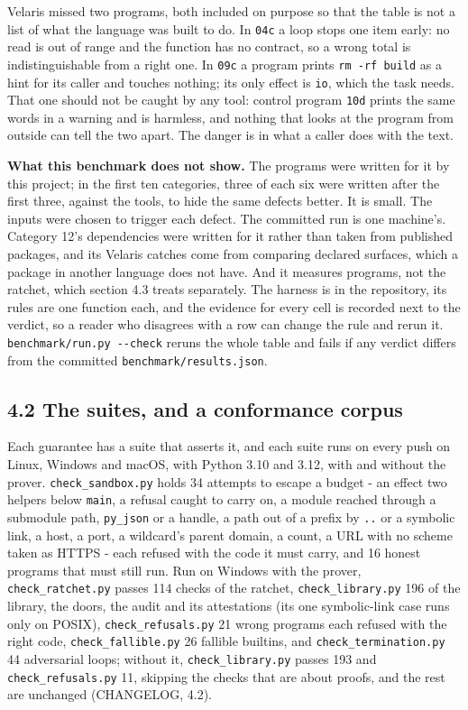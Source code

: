 \documentclass[
]{article}
\begin{document}
Velaris missed two programs, both included on purpose so that the table
is not a list of what the language was built to do. In \texttt{04c} a
loop stops one item early: no read is out of range and the function has
no contract, so a wrong total is indistinguishable from a right one. In
\texttt{09c} a program prints \texttt{rm\ -rf\ build} as a hint for its
caller and touches nothing; its only effect is \texttt{io}, which the
task needs. That one should not be caught by any tool: control program
\texttt{10d} prints the same words in a warning and is harmless, and
nothing that looks at the program from outside can tell the two apart.
The danger is in what a caller does with the text.

\textbf{What this benchmark does not show.} The programs were written
for it by this project; in the first ten categories, three of each six
were written after the first three, against the tools, to hide the same
defects better. It is small. The inputs were chosen to trigger each
defect. The committed run is one machine's. Category 12's dependencies
were written for it rather than taken from published packages, and its
Velaris catches come from comparing declared surfaces, which a package
in another language does not have. And it measures programs, not the
ratchet, which section 4.3 treats separately. The harness is in the
repository, its rules are one function each, and the evidence for every
cell is recorded next to the verdict, so a reader who disagrees with a
row can change the rule and rerun it.
\texttt{benchmark/run.py\ -\/-check} reruns the whole table and fails if
any verdict differs from the committed \texttt{benchmark/results.json}.

\subsection{4.2 The suites, and a conformance
corpus}\label{the-suites-and-a-conformance-corpus}

Each guarantee has a suite that asserts it, and each suite runs on every
push on Linux, Windows and macOS, with Python 3.10 and 3.12, with and
without the prover. \texttt{check\_sandbox.py} holds 34 attempts to
escape a budget - an effect two helpers below \texttt{main}, a refusal
caught to carry on, a module reached through a submodule path,
\texttt{py\_json} or a handle, a path out of a prefix by \texttt{..} or
a symbolic link, a host, a port, a wildcard's parent domain, a count, a
URL with no scheme taken as HTTPS - each refused with the code it must
carry, and 16 honest programs that must still run. Run on Windows with
the prover, \texttt{check\_ratchet.py} passes 114 checks of the ratchet,
\texttt{check\_library.py} 196 of the library, the doors, the audit and
its attestations (its one symbolic-link case runs only on POSIX),
\texttt{check\_refusals.py} 21 wrong programs each refused with the
right code, \texttt{check\_fallible.py} 26 fallible builtins, and
\texttt{check\_termination.py} 44 adversarial loops; without it,
\texttt{check\_library.py} passes 193 and \texttt{check\_refusals.py}
11, skipping the checks that are about proofs, and the rest are
unchanged (CHANGELOG, 4.2).
\end{document}
